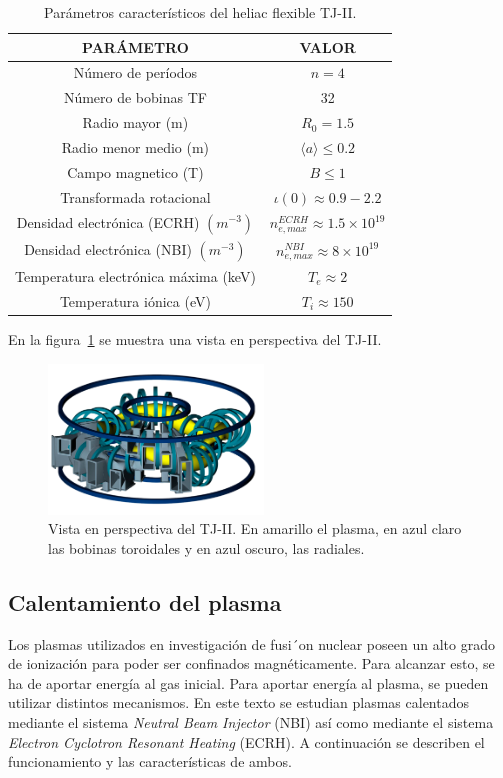 \begin{table}[H]
    \centering
    \begin{tabular}{cc}
    \hline
    PARÁMETRO & VALOR \\ \hline
    Número de períodos          & $n=4$       \\
    Número de bobinas TF          & 32       \\
    Radio mayor (m)          & $R_0=1.5$      \\
    Radio menor medio (m)          & $\langle a\rangle\leq 0.2$       \\
    Campo magnetico (T)          & $B\leq 1$       \\
    Transformada rotacional          & $\iota(0)\approx0.9-2.2$       \\
    Densidad electrónica (ECRH) $(m^{-3})$          & $n^{ECRH}_{e,max}\approx 1.5\times 10^{19}$       \\
    Densidad electrónica (NBI) $(m^{-3})$          & $n^{NBI}_{e,max}\approx 8\times 10^{19}$       \\
    Temperatura electrónica máxima (keV)          & $T_e\approx 2$      \\
    Temperatura iónica (eV)          & $T_i\approx 150$      \\ \hline
    \end{tabular}
    \caption{Parámetros característicos del heliac flexible TJ-II.}
    \label{tab:tj2}
\end{table}
En la figura~\ref{fig:view} se muestra una vista en perspectiva del TJ-II.
\begin{figure}[h!]
    \centering
    \includegraphics[height=4cm]{img/view.png}
    \caption[Vista en perspectiva del TJ-II]{Vista en perspectiva del TJ-II. En amarillo el plasma, en azul claro las bobinas toroidales y en azul oscuro, las radiales.}
    \label{fig:view}
\end{figure}
\subsection{Calentamiento del plasma}
Los plasmas utilizados en investigación de fusi´on nuclear poseen un alto grado de ionización 
para poder ser confinados magnéticamente. Para alcanzar esto, se ha de aportar energía al
gas inicial.
Para aportar energía al plasma, se pueden utilizar distintos mecanismos. En este texto se estudian
plasmas calentados mediante el sistema \textit{Neutral Beam Injector} (NBI) así como mediante
el sistema \textit{Electron Cyclotron Resonant Heating} (ECRH). A continuación se describen
el funcionamiento y las características de ambos.

